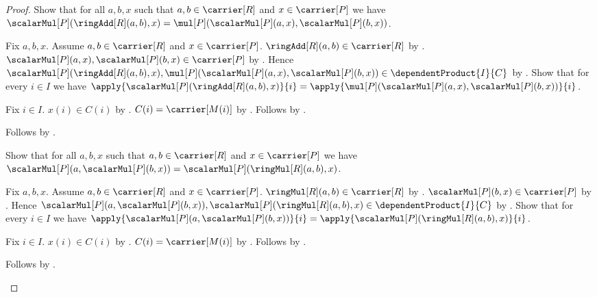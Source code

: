 \begin{proof}
    Show that for all $a,b,x$ such that $a,b\in\carrier[R]$ and
        $x\in\carrier[P]$ we have
        $\scalarMul[P](\ringAdd[R](a,b),x)
            =\mul[P](\scalarMul[P](a,x),\scalarMul[P](b,x))$.
    \begin{subproof}
        Fix $a,b,x$.
        Assume $a,b\in\carrier[R]$ and $x\in\carrier[P]$.
        $\ringAdd[R](a,b)\in\carrier[R]$ by .
        $\scalarMul[P](a,x),\scalarMul[P](b,x)\in\carrier[P]$ by
            .
        Hence
            $\scalarMul[P](\ringAdd[R](a,b),x),
                \mul[P](\scalarMul[P](a,x),\scalarMul[P](b,x))
            \in\dependentProduct{I}{C}$ by
            .
        Show that for every $i\in I$ we have
            $\apply{\scalarMul[P](\ringAdd[R](a,b),x)}{i}
                =\apply{\mul[P](
                    \scalarMul[P](a,x),\scalarMul[P](b,x))}{i}$.
        \begin{subproof}
            Fix $i\in I$.
            $x(i)\in C(i)$ by .
            $C(i)=\carrier[M(i)]$ by
                .
            Follows by
                .
        \end{subproof}
        Follows by .
    \end{subproof}

    Show that for all $a,b,x$ such that $a,b\in\carrier[R]$ and
        $x\in\carrier[P]$ we have
        $\scalarMul[P](a,\scalarMul[P](b,x))
            =\scalarMul[P](\ringMul[R](a,b),x)$.
    \begin{subproof}
        Fix $a,b,x$.
        Assume $a,b\in\carrier[R]$ and $x\in\carrier[P]$.
        $\ringMul[R](a,b)\in\carrier[R]$ by .
        $\scalarMul[P](b,x)\in\carrier[P]$ by
            .
        Hence
            $\scalarMul[P](a,\scalarMul[P](b,x)),
                \scalarMul[P](\ringMul[R](a,b),x)
            \in\dependentProduct{I}{C}$ by
            .
        Show that for every $i\in I$ we have
            $\apply{\scalarMul[P](a,\scalarMul[P](b,x))}{i}
                =\apply{\scalarMul[P](\ringMul[R](a,b),x)}{i}$.
        \begin{subproof}
            Fix $i\in I$.
            $x(i)\in C(i)$ by .
            $C(i)=\carrier[M(i)]$ by
                .
            Follows by
                .
        \end{subproof}
        Follows by .
    \end{subproof}


\end{proof}
